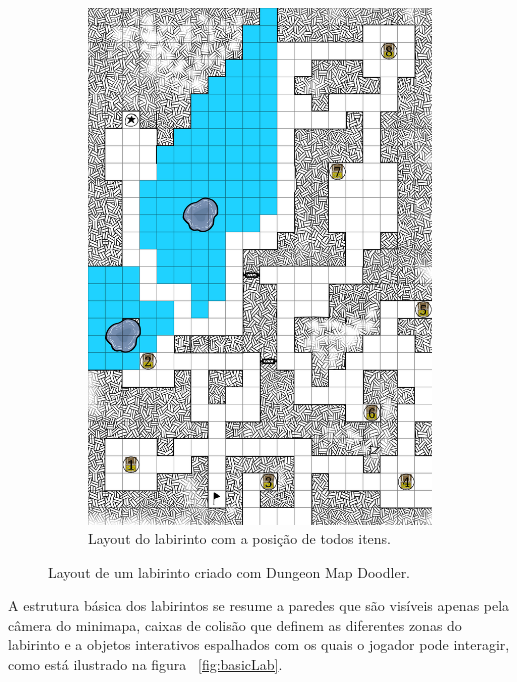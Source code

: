 \begin{figure}[h!]
\begin{subfigure}[b]{0.45\linewidth}
    \includegraphics[width=\linewidth]{dungeonItens.png}
    \caption{Layout do labirinto com a posição de todos itens.}
  \end{subfigure}
  \caption{Layout de um labirinto criado com Dungeon Map Doodler.}
  \label{fig:dungeonLayout}
\end{figure}

	A estrutura básica dos labirintos se resume a paredes que são visíveis apenas pela câmera do minimapa, caixas de colisão que definem as diferentes zonas do labirinto e a objetos interativos espalhados com os quais o jogador pode interagir, como está ilustrado na figura ~\ref{fig:basicLab}.

